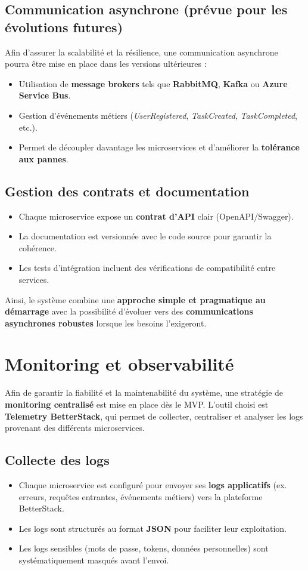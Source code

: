 \subsection{Communication asynchrone (prévue pour les évolutions futures)}
Afin d’assurer la scalabilité et la résilience, une communication asynchrone pourra être mise en place dans les versions ultérieures :
\begin{itemize}
	\item Utilisation de \textbf{message brokers} tels que \textbf{RabbitMQ}, \textbf{Kafka} ou \textbf{Azure Service Bus}.
	\item Gestion d’événements métiers (\textit{UserRegistered}, \textit{TaskCreated}, \textit{TaskCompleted}, etc.).
	\item Permet de découpler davantage les microservices et d’améliorer la \textbf{tolérance aux pannes}.
\end{itemize}

\subsection{Gestion des contrats et documentation}
\begin{itemize}
	\item Chaque microservice expose un \textbf{contrat d’API} clair (OpenAPI/Swagger).
	\item La documentation est versionnée avec le code source pour garantir la cohérence.
	\item Les tests d’intégration incluent des vérifications de compatibilité entre services.
\end{itemize}

Ainsi, le système combine une \textbf{approche simple et pragmatique au démarrage} avec la possibilité d’évoluer vers des \textbf{communications asynchrones robustes} lorsque les besoins l’exigeront.


\section{Monitoring et observabilité}
Afin de garantir la fiabilité et la maintenabilité du système, une stratégie de \textbf{monitoring centralisé} est mise en place dès le MVP. L’outil choisi est \textbf{Telemetry BetterStack}, qui permet de collecter, centraliser et analyser les logs provenant des différents microservices.

\subsection{Collecte des logs}
\begin{itemize}
	\item Chaque microservice est configuré pour envoyer ses \textbf{logs applicatifs} (ex. erreurs, requêtes entrantes, événements métiers) vers la plateforme BetterStack.
	\item Les logs sont structurés au format \textbf{JSON} pour faciliter leur exploitation.
	\item Les logs sensibles (mots de passe, tokens, données personnelles) sont systématiquement masqués avant l’envoi.
\end{itemize}

